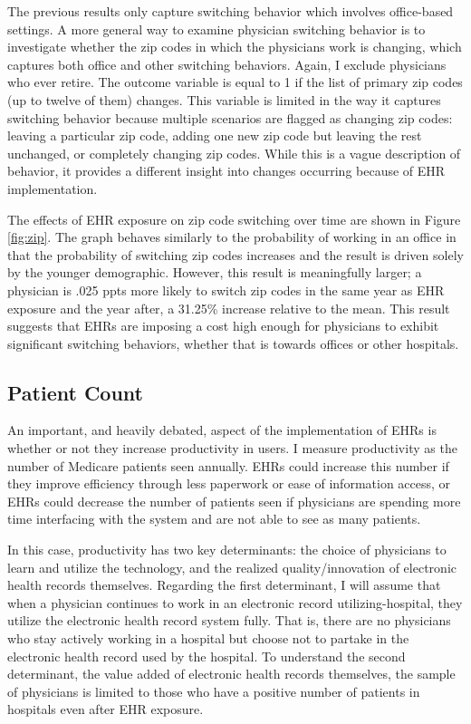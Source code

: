 \documentclass[11pt]{article}
\begin{document}
The previous results only capture switching behavior which involves office-based settings. A more general way to examine physician switching behavior is to investigate whether the zip codes in which the physicians work is changing, which captures both office and other switching behaviors. Again, I exclude physicians who ever retire. The outcome variable is equal to 1 if the list of primary zip codes (up to twelve of them) changes. This variable is limited in the way it captures switching behavior because multiple scenarios are flagged as changing zip codes: leaving a particular zip code, adding one new zip code but leaving the rest unchanged, or completely changing zip codes. While this is a vague description of behavior, it provides a different insight into changes occurring because of EHR implementation.

The effects of EHR exposure on zip code switching over time are shown in Figure \ref{fig:zip}. The graph behaves similarly to the probability of working in an office in that the probability of switching zip codes increases and the result is driven solely by the younger demographic. However, this result is meaningfully larger; a physician is .025 ppts more likely to switch zip codes in the same year as EHR exposure and the year after, a 31.25\% increase relative to the mean. This result suggests that EHRs are imposing a cost high enough for physicians to exhibit significant switching behaviors, whether that is towards offices or other hospitals.




\subsection{Patient Count}\label{sec:patientcount}

An important, and heavily debated, aspect of the implementation of EHRs is whether or not they increase productivity in users. I measure productivity as the number of Medicare patients seen annually. EHRs could increase this number if they improve efficiency through less paperwork or ease of information access, or EHRs could decrease the number of patients seen if physicians are spending more time interfacing with the system and are not able to see as many patients.

In this case, productivity has two key determinants: the choice of physicians to learn and utilize the technology, and the realized quality/innovation of electronic health records themselves. Regarding the first determinant, I will assume that when a physician continues to work in an electronic record utilizing-hospital, they utilize the electronic health record system fully. That is, there are no physicians who stay actively working in a hospital but choose not to partake in the electronic health record used by the hospital. To understand the second determinant, the value added of electronic health records themselves, the sample of physicians is limited to those who have a positive number of patients in hospitals even after EHR exposure. 
\end{document}
